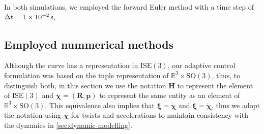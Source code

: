 In both simulations, we employed the forward Euler method with a time step of $\Delta t = \qty{1E-2}{\second}$. 
\subsection{Employed nummerical methods}\label{sec:results-adaptive-nummerical-methods}
Although the curve has a representation in $\text{ISE}(3)$, our adaptive control formulation was based on the tuple representation of $\mathbb{R}^3\times \text{SO}(3)$, thus, to distinguish both, in this section we use the notation $\mathbf{H}$ to represent the element of $\text{ISE}(3)$ and $\boldsymbol{\chi}=(\mathbf{R}, \mathbf{p})$ to represent the same entity as an element of $\mathbb{R}^3\times \text{SO}(3)$. This equivalence also implies that $\boldsymbol{\xi}=\dot{\boldsymbol{\chi}}$ and $\dot{\boldsymbol{\xi}} = \ddot{\boldsymbol{\chi}}$, thus we adopt the notation using $\boldsymbol{\chi}$ for twists and accelerations to maintain consistency with the dynamics in \cref{sec:dynamic-modelling}.

